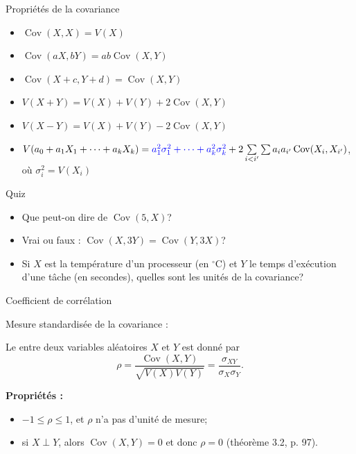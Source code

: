 \documentclass{BeamerTemplate}
\newcommand{\cibleReponse}{}
\newcommand{\lienreponse}[1]{\gdef\cibleReponse{#1}}
\newcommand{\Cov}{\operatorname{Cov}}
\begin{document}
\begin{frame}[t]{Propriétés de la covariance}
 \begin{itemize}\itemsep4mm
 \item $\Cov(X, X)=V(X)$
 \item $\Cov(aX, bY)=ab\Cov(X, Y)$
 \item $\Cov(X+c, Y+d)=\Cov(X, Y)$
 \item $V(X+Y)=V(X)+V(Y)+2 \Cov(X,Y)$
 \item $V(X-Y)=V(X)+V(Y)-2 \Cov(X,Y)$
 \item {\small $V(a_0+a_1X_1+\cdots+a_kX_k)=
 {\color{blue}{ a_1^2\sigma^2_1+\cdots+a_k^2\sigma^2_k}}
 +2\sum\limits_{i<i'}\sum a_ia_{i'}\Cov(X_i,X_{i'})$, où $\sigma_i^2=V(X_i)$}
\end{itemize}
\end{frame}


\begin{frame}[t,label=quizcov]{Quiz}

\begin{itemize}\itemsep1.5cm
\item Que peut-on dire de $\Cov(5,X)$?
\item Vrai ou faux : $\Cov(X,3Y)=\Cov(Y,3X)$?
\item Si $X$ est la température d'un processeur (en $^\circ$C) et $Y$ le temps d'exécution d'une tâche
(en secondes), quelles sont les unités de la covariance?
\end{itemize}

\lienreponse{rep-quiz}
\end{frame}


\begin{frame}[t]{Coefficient de corrélation}

Mesure standardisée de la covariance :

\begin{defn}{}
 Le  entre deux variables aléatoires $X$ et $Y$ est donné par
 $$\rho=\frac{\Cov(X,Y)}{\sqrt{V(X)V(Y)}}=\frac{\sigma_{XY}}{\sigma_X\sigma_Y}.$$
\end{defn}

\vspace{0.1in}
\textbf{Propriétés :}
\begin{itemize}\itemsep6pt
 \item $-1\le \rho\le 1$, et $\rho$ n'a pas d'unité de mesure;
 \item si $X\perp Y$, alors $\Cov(X,Y)=0$ et donc $\rho=0$ (théorème 3.2, p. 97).
\end{itemize}
\end{frame}
\end{document}
